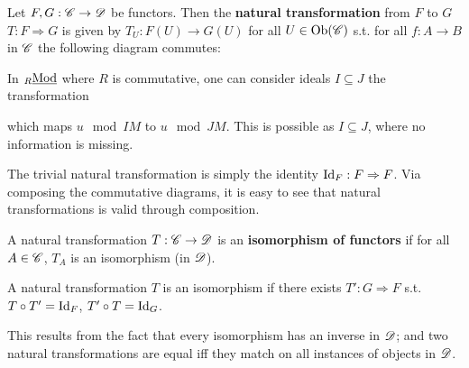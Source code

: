 \documentclass{article}
\begin{document}
\begin{definition}
    Let $F, G: \mathscr{C} \to \mathscr{D}$ be functors. Then the \textbf{natural transformation} from $F$ to $G$ $T: F \Rightarrow G$ is given by $T_U: F(U) \to G(U)$ for all $U \in \mathrm{Ob}(\mathscr{C})$ s.t. for all $f: A \to B$ in $\mathscr{C}$ the following diagram commutes:
    \begin{figure}[htbp]
        \centering
    \end{figure}
\end{definition}

\begin{example}
    In ${}_{R}\underline{\textup{Mod}}$ where $R$ is commutative, one can consider ideals $I \subseteq J$ the transformation
    \begin{figure}[htbp]
        \centering
    \end{figure}
    which maps $u \mod{IM}$ to $u \mod{JM}$. This is possible as $I \subseteq J$, where no information is missing.
\end{example}

\begin{remark}
    The trivial natural transformation is simply the identity $\mathrm{Id}_F: F \Rightarrow F$. Via composing the commutative diagrams, it is easy to see that natural transformations is valid through composition.
\end{remark}

\begin{definition}
    A natural transformation $T: \mathscr{C} \to \mathscr{D}$ is an \textbf{isomorphism of functors} if for all $A \in \mathscr{C}$, $T_A$ is an isomorphism (in $\mathscr{D}$). 
\end{definition}

\begin{remark}
    A natural transformation $T$ is an isomorphism if there exists $T': G \Rightarrow F$ s.t. $T \circ T' = \mathrm{Id}_F$, $T' \circ T = \mathrm{Id}_G$.

    This results from the fact that every isomorphism has an inverse in $\mathscr{D}$; and two natural transformations are equal iff they match on all instances of objects in $\mathscr{D}$.
\end{remark}
\end{document}
